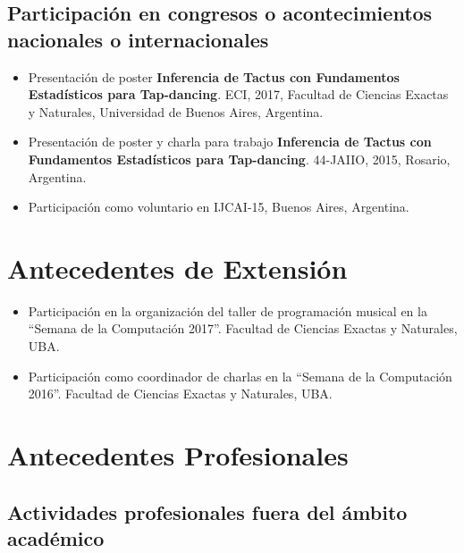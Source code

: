 \documentclass[a4paper,10pt]{article}
\begin{document}
\subsection{Participación en congresos o acontecimientos nacionales o
internacionales}

\begin{itemize}
    \item Presentación de poster 
\textbf{Inferencia de Tactus con Fundamentos Estadísticos para
        Tap-dancing}.\enpublicados{} ECI, 2017, Facultad de Ciencias Exactas y
        Naturales, Universidad de Buenos Aires, Argentina.
    \item Presentación de poster y charla para trabajo 
\textbf{Inferencia de Tactus con Fundamentos Estadísticos para
        Tap-dancing}.\enpublicados{} 44-JAIIO, 2015, Rosario, Argentina.
    \item Participación como voluntario en IJCAI-15, Buenos Aires, Argentina.
\end{itemize}

\section{Antecedentes de Extensión}

\begin{itemize}
    \item Participación en la organización del taller de programación musical
        en la “Semana de la Computación 2017”. Facultad de Ciencias Exactas y
        Naturales, UBA. 
    \item Participación como coordinador de charlas en la “Semana de la
        Computación 2016”. Facultad de Ciencias Exactas y Naturales, UBA. 
\end{itemize}

\section{Antecedentes Profesionales}

\subsection{Actividades profesionales fuera del ámbito académico}
\end{document}
